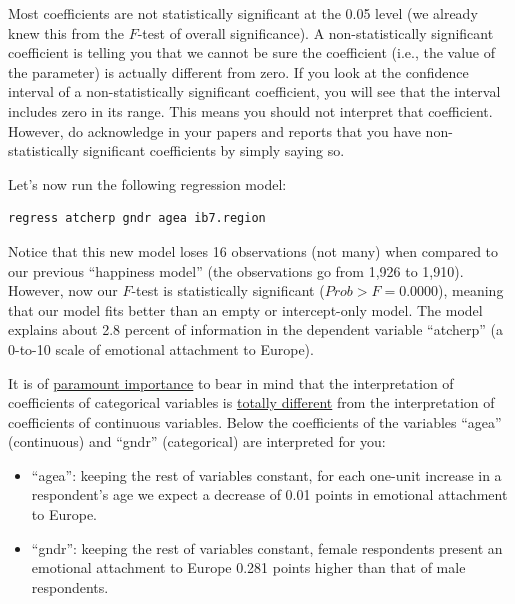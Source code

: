 \documentclass{article}
\begin{document}
Most coefficients are not statistically significant at the 0.05 level (we already knew this from the $F$-test of overall significance). A non-statistically significant coefficient is telling you that we cannot be sure the coefficient (i.e., the value of the parameter) is actually different from zero. If you look at the confidence interval of a non-statistically significant coefficient, you will see that the interval includes zero in its range. This means you should not interpret that coefficient. However, do acknowledge in your papers and reports that you have non-statistically significant coefficients by simply saying so.

Let's now run the following regression model:

\begin{lstlisting}
regress atcherp gndr agea ib7.region
\end{lstlisting}

Notice that this new model loses 16 observations (not many) when compared to our previous ``happiness model'' (the observations go from 1,926 to 1,910). However, now our $F$-test is statistically significant  ($Prob > F = 0.0000$), meaning that our model fits better than an empty or intercept-only model. The model explains about 2.8 percent of information in the dependent variable ``atcherp'' (a 0-to-10 scale of emotional attachment to Europe).

It is of \underline{paramount importance} to bear in mind that the interpretation of coefficients of categorical variables is \underline{totally different} from the interpretation of coefficients of continuous variables. Below the coefficients of the variables ``agea'' (continuous) and ``gndr'' (categorical) are interpreted for you:

\begin{itemize}
	\item ``agea'': keeping the rest of variables constant, for each one-unit increase in a respondent's age we expect a decrease of 0.01 points in emotional attachment to Europe.
	\item ``gndr'': keeping the rest of variables constant, female respondents present an emotional attachment to Europe 0.281 points higher than that of male respondents. 
\end{itemize}
\end{document}
